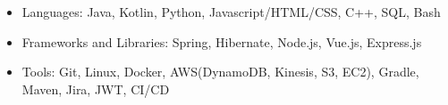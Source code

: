 \begin{cvsubsection}{}{}{}
    \begin{itemize}
        \item Languages: Java, Kotlin, Python, Javascript/HTML/CSS, C++, SQL, Bash
        \item Frameworks and Libraries: Spring, Hibernate, Node.js, Vue.js, Express.js
        \item Tools: Git, Linux, Docker, AWS(DynamoDB, Kinesis, S3, EC2), Gradle, Maven, Jira, JWT, CI/CD
    \end{itemize}
\end{cvsubsection}